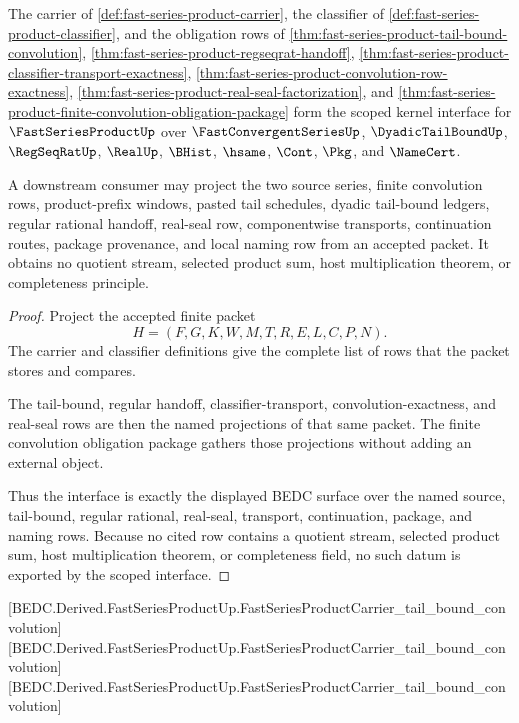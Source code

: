 \begin{theorem}
\label{thm:fast-series-product-scoped-kernel-interface}
The carrier of \autoref{def:fast-series-product-carrier}, the classifier of \autoref{def:fast-series-product-classifier}, and the obligation rows of \autoref{thm:fast-series-product-tail-bound-convolution}, \autoref{thm:fast-series-product-regseqrat-handoff}, \autoref{thm:fast-series-product-classifier-transport-exactness}, \autoref{thm:fast-series-product-convolution-row-exactness}, \autoref{thm:fast-series-product-real-seal-factorization}, and \autoref{thm:fast-series-product-finite-convolution-obligation-package} form the scoped kernel interface for $\FastSeriesProductUp$ over $\FastConvergentSeriesUp$, $\DyadicTailBoundUp$, $\RegSeqRatUp$, $\RealUp$, $\BHist$, $\hsame$, $\Cont$, $\Pkg$, and $\NameCert$.

A downstream consumer may project the two source series, finite convolution rows, product-prefix windows, pasted tail schedules, dyadic tail-bound ledgers, regular rational handoff, real-seal row, componentwise transports, continuation routes, package provenance, and local naming row from an accepted packet. It obtains no quotient stream, selected product sum, host multiplication theorem, or completeness principle.
\end{theorem}
\begin{proof}
Project the accepted finite packet
$$
H=(F,G,K,W,M,T,R,E,L,C,P,N).
$$
The carrier and classifier definitions give the complete list of rows that the packet stores and compares.

The tail-bound, regular handoff, classifier-transport, convolution-exactness, and real-seal rows are then the named projections of that same packet. The finite convolution obligation package gathers those projections without adding an external object.

Thus the interface is exactly the displayed BEDC surface over the named source, tail-bound, regular rational, real-seal, transport, continuation, package, and naming rows. Because no cited row contains a quotient stream, selected product sum, host multiplication theorem, or completeness field, no such datum is exported by the scoped interface.
\end{proof}

[BEDC.Derived.FastSeriesProductUp.FastSeriesProductCarrier\_tail\_bound\_convolution]
[BEDC.Derived.FastSeriesProductUp.FastSeriesProductCarrier\_tail\_bound\_convolution]
[BEDC.Derived.FastSeriesProductUp.FastSeriesProductCarrier\_tail\_bound\_convolution]

